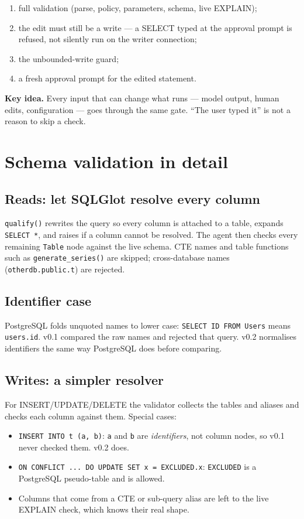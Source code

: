 \documentclass[11pt,a4paper]{article}
\newcommand{\keyidea}[1]{%
  \par\smallskip\noindent\colorbox{notebg}{\parbox{\dimexpr\linewidth-2\fboxsep}{\small\textbf{Key idea.} #1}}\par\smallskip}
\begin{document}
\begin{enumerate}[leftmargin=*]
  \item full validation (parse, policy, parameters, schema, live EXPLAIN);
  \item the edit must still be a write --- a SELECT typed at the approval
        prompt is refused, not silently run on the writer connection;
  \item the unbounded-write guard;
  \item a fresh approval prompt for the edited statement.
\end{enumerate}

\keyidea{Every input that can change what runs --- model output, human edits,
configuration --- goes through the same gate. ``The user typed it'' is not a
reason to skip a check.}

\section{Schema validation in detail}

\subsection*{Reads: let SQLGlot resolve every column}
\texttt{qualify()} rewrites the query so every column is attached to a
table, expands \texttt{SELECT *}, and raises if a column cannot be resolved.
The agent then checks every remaining \texttt{Table} node against the live
schema. CTE names and table functions such as \texttt{generate\_series()}
are skipped; cross-database names (\texttt{otherdb.public.t}) are rejected.

\subsection*{Identifier case}
PostgreSQL folds unquoted names to lower case:
\texttt{SELECT ID FROM Users} means \texttt{users.id}. v0.1 compared the raw
names and rejected that query. v0.2 normalises identifiers the same way
PostgreSQL does before comparing.

\subsection*{Writes: a simpler resolver}
For INSERT/UPDATE/DELETE the validator collects the tables and aliases and
checks each column against them. Special cases:
\begin{itemize}[leftmargin=*]
  \item \texttt{INSERT INTO t (a, b)}: \texttt{a} and \texttt{b} are
        \emph{identifiers}, not column nodes, so v0.1 never checked them.
        v0.2 does.
  \item \texttt{ON CONFLICT ... DO UPDATE SET x = EXCLUDED.x}:
        \texttt{EXCLUDED} is a PostgreSQL pseudo-table and is allowed.
  \item Columns that come from a CTE or sub-query alias are left to the
        live EXPLAIN check, which knows their real shape.
\end{itemize}
\end{document}
